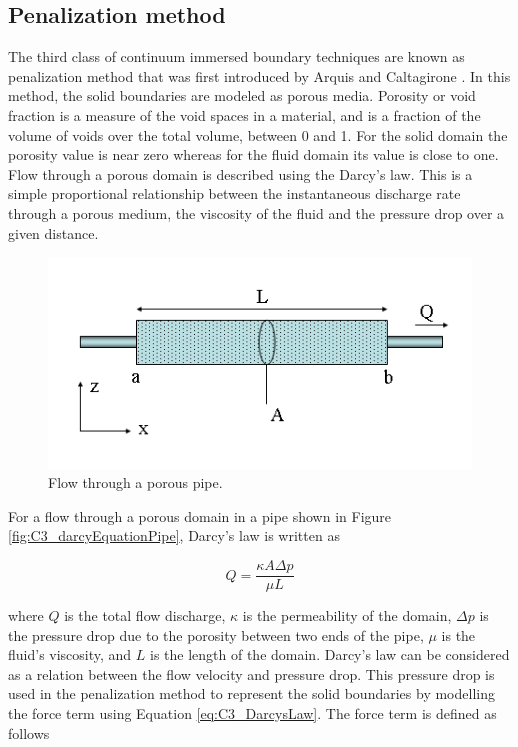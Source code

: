 \subsection{Penalization method}
The third class of continuum immersed boundary techniques are known as penalization method that was first introduced by Arquis and Caltagirone \cite{ arquis1984conditions}. In this method, the solid boundaries are modeled as porous media. Porosity or void fraction is a measure of the void spaces in a material, and is a fraction of the volume of voids over the total volume, between 0 and 1. For the solid domain the porosity value is near zero whereas for the fluid domain its value is close to one. Flow through a porous domain is described using the Darcy's law. This is a simple proportional relationship between the instantaneous discharge rate through a porous medium, the viscosity of the fluid and the pressure drop over a given distance.

\begin{figure}[h]
	\centering
	\includegraphics[width=14.cm]{Chapter_3/figure/Darcys_Law.png}
	\caption{Flow through a porous pipe.}
\end{figure}

For a flow through a porous domain in a pipe shown in Figure \ref{fig:C3_darcyEquationPipe}, Darcy's law is written as

\begin{equation}\label{eq:C3_DarcysLaw}
	Q = \frac{\kappa A \Delta p}{\mu L}
\end{equation}

where $Q$ is the total flow discharge, $\kappa$ is the permeability of the domain, $\Delta p$ is the pressure drop due to the porosity between two ends of the pipe, $\mu$ is the fluid's viscosity, and $L$ is the length of the domain. Darcy's law can be considered as a relation between the flow velocity and pressure drop. This pressure drop  is used in the penalization method to represent the solid boundaries by modelling the force term using Equation \eqref{eq:C3_DarcysLaw}. The force term is defined as follows

